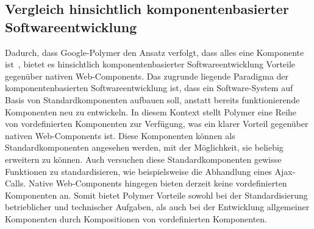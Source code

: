 \subsection{Vergleich hinsichtlich komponentenbasierter Softwareentwicklung}
\label{sec:5_Vergleich_CBSE}

Dadurch, dass Google-Polymer den Ansatz verfolgt, dass \glqq alles eine Komponente ist\grqq\ \citereset \autocite{Polymer}, bietet es hinsichtlich komponentenbasierter Softwareentwicklung Vorteile gegenüber nativen Web-Components. Das zugrunde liegende Paradigma der komponentenbasierten Softwareentwicklung ist, dass ein Software-System auf Basis von Standardkomponenten aufbauen soll, anstatt bereits funktionierende Komponenten neu zu entwickeln. In diesem Kontext stellt Polymer eine Reihe von vordefinierten Komponenten zur Verfügung, was ein klarer Vorteil gegenüber nativen Web-Components ist. Diese Komponenten können als Standardkomponenten angesehen werden, mit der Möglichkeit, sie beliebig erweitern zu können. Auch versuchen diese Standardkomponenten gewisse Funktionen zu standardisieren, wie beispielsweise die Abhandlung eines Ajax-Calls. Native Web-Components hingegen bieten derzeit keine vordefinierten Komponenten an. Somit bietet Polymer Vorteile sowohl bei der Standardisierung betrieblicher und technischer Aufgaben, als auch bei der Entwicklung allgemeiner Komponenten durch Kompositionen von vordefinierten Komponenten.